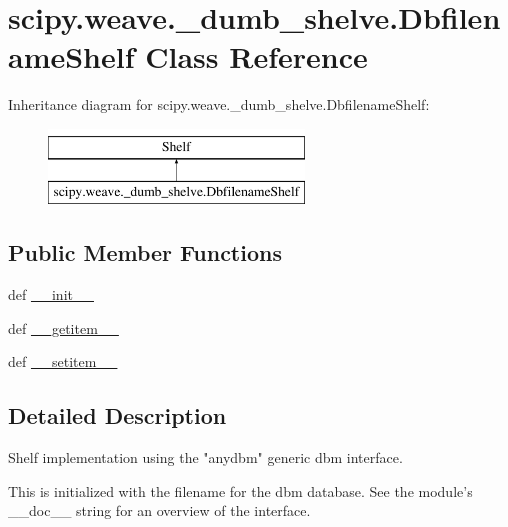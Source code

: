 \hypertarget{classscipy_1_1weave_1_1__dumb__shelve_1_1DbfilenameShelf}{}\section{scipy.\+weave.\+\_\+dumb\+\_\+shelve.\+Dbfilename\+Shelf Class Reference}
\label{classscipy_1_1weave_1_1__dumb__shelve_1_1DbfilenameShelf}
Inheritance diagram for scipy.\+weave.\+\_\+dumb\+\_\+shelve.\+Dbfilename\+Shelf\+:\begin{figure}[H]
\begin{center}
\leavevmode
\includegraphics[height=2.000000cm]{classscipy_1_1weave_1_1__dumb__shelve_1_1DbfilenameShelf}
\end{center}
\end{figure}
\subsection*{Public Member Functions}
\begin{DoxyCompactItemize}
\item 
def \hyperlink{classscipy_1_1weave_1_1__dumb__shelve_1_1DbfilenameShelf_a7c90799271da03ec6f52c7893b6aad6c}{\+\_\+\+\_\+init\+\_\+\+\_\+}
\item 
def \hyperlink{classscipy_1_1weave_1_1__dumb__shelve_1_1DbfilenameShelf_aba92ff0239ec9b30c3b09b28d9782cbb}{\+\_\+\+\_\+getitem\+\_\+\+\_\+}
\item 
def \hyperlink{classscipy_1_1weave_1_1__dumb__shelve_1_1DbfilenameShelf_a76a3d61f80a1b0e38b04f8f6bbfd9818}{\+\_\+\+\_\+setitem\+\_\+\+\_\+}
\end{DoxyCompactItemize}


\subsection{Detailed Description}
\begin{DoxyVerb}Shelf implementation using the "anydbm" generic dbm interface.

This is initialized with the filename for the dbm database.
See the module's __doc__ string for an overview of the interface.
\end{DoxyVerb}
 

